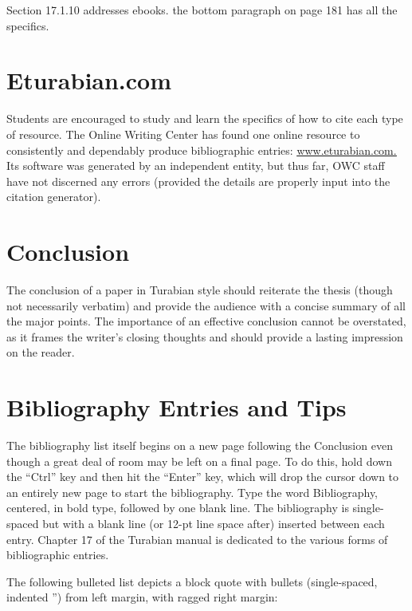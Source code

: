 \documentclass[raggedright]{turabian-researchpaper}
\newcommand*{\bluehref}[2]{\href{#1}{\color{blue}\underline{#2}}}
\begin{document}
Section 17.1.10 addresses ebooks. the bottom paragraph on page 181 has all the
specifics.\autocite[181]{Turabian}

\section[eTurabian.com]{Eturabian.com}

Students are encouraged to study and learn the specifics of how to cite each
type of resource. The Online Writing Center has found one online resource to
consistently and dependably produce bibliographic entries:
\bluehref{http://www.eturabian.com/}{www.eturabian.com.} Its software was
generated by an independent entity, but thus far, OWC staff have not discerned
any errors (provided the details are properly input into the citation
generator).

\section{Conclusion}

The conclusion of a paper in Turabian style should reiterate the thesis (though
not necessarily verbatim) and provide the audience with a concise summary of all
the major points. The importance of an effective conclusion cannot be
overstated, as it frames the writer's closing thoughts and should provide a
lasting impression on the reader.

\section{Bibliography Entries and Tips}

The bibliography list itself begins on a new page following the Conclusion even
though a great deal of room may be left on a final page. To do this, hold down
the ``Ctrl'' key and then hit the ``Enter'' key, which will drop the cursor down
to an entirely new page to start the bibliography. Type the word Bibliography,
centered, in bold type, followed by one blank line. The bibliography is
single-spaced but with a blank line (or 12-pt line space after) inserted between
each entry. Chapter 17 of the Turabian manual is dedicated to the various forms
of bibliographic entries.\autocite[164-215]{Turabian}

The following bulleted list depicts a block quote with bullets (single-spaced,
indented '') from left margin, with ragged right margin:
\end{document}
